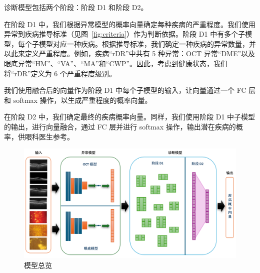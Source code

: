 \documentclass{article}
\begin{document}
\begin{multicols}{2}
	\vspace{0.5cm}
	
	诊断模型包括两个阶段：阶段 D1 和阶段 D2。
	
	\vspace{0.2cm}
	
	在阶段 D1 中，我们根据异常模型的概率向量确定每种疾病的严重程度。我们使用异常到疾病推导标准（见图~\ref{fig:criteria}）作为判断依据。阶段 D1 中有多个子模型，每个子模型对应一种疾病。根据推导标准，我们确定一种疾病的异常数量，并以此来定义严重程度。例如，疾病“rDR”中共有 5 种异常：OCT 异常“DME”以及眼底异常“HM”、“VA”、“MA”和“CWP”。因此，考虑到健康状态，我们将“rDR”定义为 6 个严重程度级别。
	
	我们使用融合后的向量作为阶段 D1 中每个子模型的输入，让向量通过一个 FC 层和 softmax 操作，以生成严重程度的概率向量。
	
	在阶段 D2 中，我们确定最终的疾病概率向量。同样，我们使用阶段 D1 中子模型的输出，进行向量融合，通过 FC 层并进行 softmax 操作，输出潜在疾病的概率，供眼科医生参考。
	
	\end{multicols}
	
	\begin{figure}[htbp]
		\centering
		\includegraphics[width=\linewidth]{Figs/model_overview.png}
		\caption{模型总览}
		\vspace{0.3cm}
		\label{fig:3_parts}
		\vspace{1cm}
	\end{figure}
	
\end{document}

